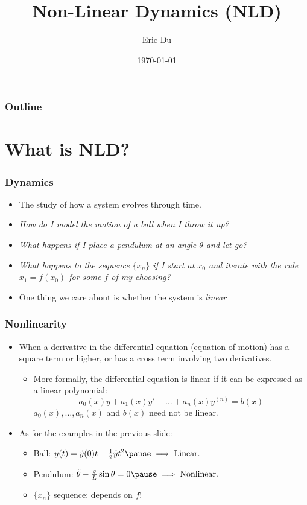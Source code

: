 \documentclass[9pt]{beamer}
\title{Non-Linear Dynamics (NLD)}
\author{Eric Du}
\institute{University of California, Berkeley}
\date{\today}
\begin{document}
	
\frame{\titlepage}

\begin{frame}
	\frametitle{Outline}
	\tableofcontents
\end{frame}

\section{What is NLD?}
\begin{frame}
	\frametitle{Dynamics}
	\begin{itemize}
		\item The study of how a system evolves through time. 
			\pause 
		\item \textit{How do I model the motion of a ball when I throw it up?}
			\pause 
		\item \textit{What happens if I place a pendulum at an angle 
			\( \theta \) and let go?}
			\pause 
		\item \textit{What happens to the sequence \( \{x_n\} \) if I start at 
				\( x_0 \) and iterate with the rule \( x_1 = f(x_0) \) 
			for some \( f \) of my choosing?} 
			\pause 
		\item One thing we care about is whether the system is \textit{linear}
	\end{itemize}
\end{frame}

\begin{frame}
	\frametitle{Nonlinearity}
	\begin{itemize}
		\item When a derivative in the differential equation (equation of motion) has a 
			square term or higher, or has a cross term involving two derivatives.  
			\begin{itemize}
				\item More formally, the differential equation is linear if it can be
					expressed as a linear polynomial:
					\[
						a_0(x)y + a_1(x) y' + \dots + a_n(x) y^{(n)} = b(x) 
					\]
					\( a_0(x), \dots, a_{n}(x) \) and \( b(x) \) need not be linear. 
			\end{itemize}
		\item As for the examples in the previous slide:
			\begin{itemize}
				\item Ball: \( y(t) = \dot y(0) t - \frac{1}{2}\ddot y t^2 \pause \implies \text{Linear.} \)  
					\pause 
				\item Pendulum: \( \ddot \theta - \frac{g}{L} \sin \theta 
					= 0 \pause \implies \text{Nonlinear.}\)
					\pause
				\item \( \{x_n\} \) sequence: \pause depends on \( f \)!
			\end{itemize}
	\end{itemize}
\end{frame}
\end{document}
